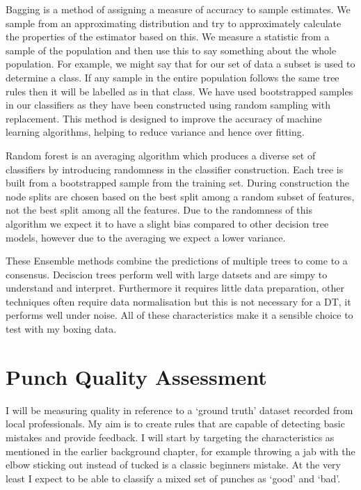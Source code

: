 Bagging is a method of assigning a measure of accuracy to sample estimates. We sample from an approximating distribution and try to approximately calculate the
properties of the estimator based on this. We measure a statistic from a sample of the population and then use this to say something about the whole population. For example, we might say that for our set of data a subset is used to determine a class. If any sample in the entire population follows the same tree rules then it will be labelled as in that class. We have used bootstrapped samples in our classifiers as they have been constructed using random sampling with replacement. 
This method is designed to improve the accuracy of machine learning algorithms, helping to reduce variance and hence over fitting. 

Random forest is an averaging algorithm which produces a diverse set of classifiers by introducing randomness in the classifier construction. Each tree is built from a bootstrapped sample from the training set. During construction the node splits are chosen based on the best split among a random subset of features, not the best split among all the features. Due to the randomness of this algorithm we expect it to have a slight bias compared to other decision tree models, however due to the averaging we expect a lower variance.

These Ensemble methods combine the predictions of multiple trees to come to a consensus. Deciscion trees perform well with large datsets and are simpy to understand and interpret. Furthermore it requires little data preparation, other techniques often require data normalisation but this is not necessary for a DT, it performs well under noise. All of these characteristics make it a sensible choice to test with my boxing data.

\section{Punch Quality Assessment}
I will be measuring quality in reference to a `ground truth' dataset
recorded from local professionals. My aim is to create rules that are capable of detecting basic mistakes and provide feedback. I will start by targeting the characteristics as mentioned in the earlier background chapter, for example throwing a jab with the elbow sticking out instead of tucked is a classic beginners mistake. At the very least I expect to be able to classify a mixed set of punches as `good' and `bad'.

